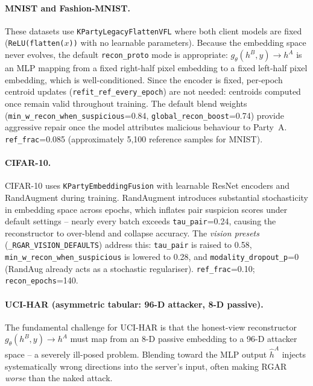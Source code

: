 \documentclass{article}
\begin{document}
\paragraph{MNIST and Fashion-MNIST.}
These datasets use \texttt{KPartyLegacyFlattenVFL} where both client models
are fixed (\texttt{ReLU(flatten($x$))} with no learnable parameters).
Because the embedding space never evolves, the default \texttt{recon\_proto}
mode is appropriate: $g_\theta(h^B, y) \to h^A$ is an MLP mapping from a
fixed right-half pixel embedding to a fixed left-half pixel embedding, which
is well-conditioned.
Since the encoder is fixed, per-epoch centroid updates (\texttt{refit\_ref\_every\_epoch})
are not needed: centroids computed once remain valid throughout training.
The default blend weights (\texttt{min\_w\_recon\_when\_suspicious}=0.84,
\texttt{global\_recon\_boost}=0.74) provide aggressive repair once the
model attributes malicious behaviour to Party~A.
\texttt{ref\_frac}=0.085 (approximately 5,100 reference samples for MNIST).

\paragraph{CIFAR-10.}
CIFAR-10 uses \texttt{KPartyEmbeddingFusion} with learnable ResNet encoders
and RandAugment during training.
RandAugment introduces substantial stochasticity in embedding space across
epochs, which inflates pair suspicion scores under default settings -- nearly
every batch exceeds \texttt{tau\_pair}=0.24, causing the reconstructor to
over-blend and collapse accuracy.
The \emph{vision presets} (\texttt{\_RGAR\_VISION\_DEFAULTS}) address this:
\texttt{tau\_pair} is raised to 0.58, \texttt{min\_w\_recon\_when\_suspicious}
is lowered to 0.28, and \texttt{modality\_dropout\_p}=0 (RandAug already
acts as a stochastic regulariser).
\texttt{ref\_frac}=0.10; \texttt{recon\_epochs}=140.

\paragraph{UCI-HAR (asymmetric tabular: 96-D attacker, 8-D passive).}
The fundamental challenge for UCI-HAR is that the honest-view reconstructor
$g_\theta(h^B, y) \to h^A$ must map from an 8-D passive embedding to a 96-D
attacker space -- a severely ill-posed problem.
Blending toward the MLP output $\hat{h}^A$ injects systematically wrong
directions into the server's input, often making RGAR \emph{worse} than the
naked attack.
\end{document}

